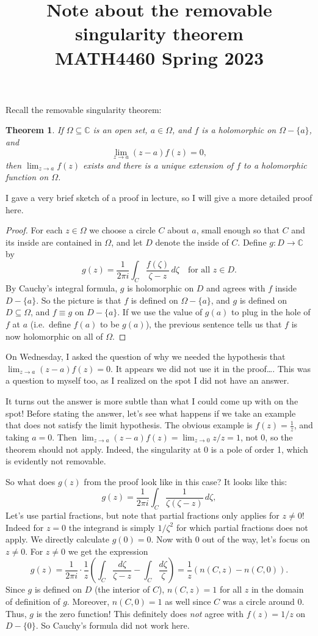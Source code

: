 \documentclass[12pt,oneside]{amsart}
\title{Note about the removable singularity theorem\\
MATH4460 Spring 2023}
\newtheorem{theorem}{Theorem}
\newcommand{\bC}{\mathbb C}
\begin{document}
\maketitle

Recall the removable singularity theorem:
\begin{theorem}
  If $\Omega\subseteq\bC$ is an open set, $a\in\Omega$, and $f$ is a holomorphic on $\Omega-\{a\}$, and
  \[\lim_{z\to a}(z-a)f(z)=0,\]
  then $\lim_{z\to a}f(z)$ exists and there is a unique extension of $f$ to a holomorphic function on $\Omega$.
\end{theorem}

I gave a very brief sketch of a proof in lecture, so I will give a more detailed proof here.
\begin{proof}
  For each $z\in\Omega$ we choose a circle $C$ about $a$, small enough so that $C$ and its inside are contained in $\Omega$, and let $D$ denote the inside of $C$. Define $g\colon D\to\bC$ by
  \[g(z)=\frac 1{2\pi i}\int_{C}\frac{f(\zeta)}{\zeta-z}\,d\zeta\quad\text{for all }z\in D.\]
  By Cauchy's integral formula, $g$ is holomorphic on $D$ and agrees with $f$ inside $D-\{a\}$. So the picture is that $f$ is defined on $\Omega-\{a\}$, and $g$ is defined on $D\subseteq \Omega$, and $f\equiv g$ on $D-\{a\}$. If we use the value of $g(a)$ to plug in the hole of $f$ at $a$ (i.e.\ define $f(a)$ to be $g(a)$), the previous sentence tells us that $f$ is now holomorphic on all of $\Omega$.
\end{proof}
On Wednesday, I asked the question of why we needed the hypothesis that $\lim_{z\to a}(z-a)f(z)=0$. It appears we did not use it in the proof\ldots. This was a question to myself too, as I realized on the spot I did not have an answer.

It turns out the answer is more subtle than what I could come up with on the spot! Before stating the answer, let's see what happens if we take an example that does not satisfy the limit hypothesis. The obvious example is $f(z)=\frac 1z$, and taking $a=0$. Then $\lim_{z\to a}(z-a)f(z)=\lim_{z\to 0}z/z=1$, not 0, so the theorem should not apply. Indeed, the singularity at 0 is a pole of order 1, which is evidently not removable.

So what does $g(z)$ from the proof look like in this case? It looks like this:
\[g(z)=\frac 1{2\pi i}\int_C \frac 1{\zeta(\zeta-z)}\,d\zeta,\]
Let's use partial fractions, but note that partial fractions only applies for $z\neq 0$! Indeed for $z=0$ the integrand is simply $1/\zeta^2$ for which partial fractions does not apply. We directly calculate $g(0)=0$. Now with 0 out of the way, let's focus on $z\neq 0$. For $z\neq 0$ we get the expression
\[g(z)=\frac 1{2\pi i}\cdot\frac 1z\left(\int_C \frac {d\zeta}{\zeta-z}-\int_C\frac{d\zeta}{\zeta}\right)=\frac 1z(n(C,z)-n(C,0)).\]
Since $g$ is defined on $D$ (the interior of $C$), $n(C,z)=1$ for all $z$ in the domain of definition of $g$. Moreover, $n(C,0)=1$ as well since $C$ was a circle around 0. Thus, $g$ is the zero function! This definitely does \emph{not} agree with $f(z)=1/z$ on $D-\{0\}$. So Cauchy's formula did not work here.
\end{document}
